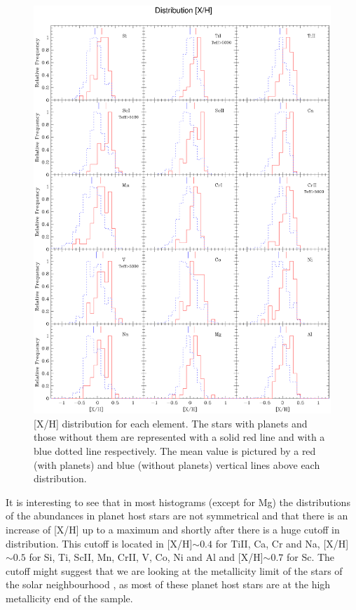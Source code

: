 \documentclass[dvips,12pt,a4paper]{report}
\begin{document}
{{\begin{figure}[h!]
\centering
\includegraphics[trim=0cm 1.5cm 0cm 1cm,clip,width=15 cm]{pics/parte4/histxhfinal.eps}
\caption[depois]{[X/H] distribution for each element. The stars with planets and those without them are represented with a solid red line and with a blue dotted line respectively. The mean value is pictured by a red (with planets) and blue (without planets) vertical lines above each distribution.}
\label{gfxdistro}
\end{figure}





It is interesting to see that in most histograms (except for Mg) the distributions of the abundances in planet host stars are not symmetrical and that there is an increase of [X/H] up to a maximum and shortly after there is a huge cutoff in distribution. This cutoff is located in [X/H]$\sim0.4$ for TiII, Ca, Cr and Na, [X/H]$\sim0.5$ for Si, Ti, ScII, Mn, CrII, V, Co, Ni and Al and [X/H]$\sim0.7$ for Sc. The cutoff might suggest that we are looking at the metallicity limit of the stars of the solar neighbourhood \citep[e.g.][]{Santos-2003}, as most of these planet host stars are at the high metallicity end of the sample. 

}}
\end{document}
